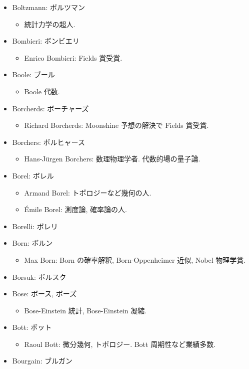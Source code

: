 \documentclass[openany, a4paper, oneside]{jsbook}
\begin{document}
\begin{itemize}
\item Boltzmann: ボルツマン
\begin{itemize}
\item 統計力学の超人.
\end{itemize}
\item Bombieri: ボンビエリ
\begin{itemize}
\item Enrico Bombieri: Fields 賞受賞.
\end{itemize}
\item Boole: ブール
\begin{itemize}
\item Boole 代数.
\end{itemize}
\item Borcherds: ボーチャーズ
\begin{itemize}
\item Richard Borcherds: Moonshine 予想の解決で Fields 賞受賞.
\end{itemize}
\item Borchers: ボルヒャース
\begin{itemize}
\item Hans-J\"urgen Borchers: 数理物理学者. 代数的場の量子論.
\end{itemize}
\item Borel: ボレル
\begin{itemize}
\item Armand Borel: トポロジーなど幾何の人.
\item \'Emile Borel: 測度論, 確率論の人.
\end{itemize}
\item Borelli: ボレリ
\item Born: ボルン
\begin{itemize}
\item Max Born: Born の確率解釈, Born-Oppenheimer 近似, Nobel 物理学賞.
\end{itemize}
\item Borsuk: ボルスク
\item Bose: ボース, ボーズ
\begin{itemize}
\item Bose-Einstein 統計, Bose-Einstein 凝縮.
\end{itemize}
\item Bott: ボット
\begin{itemize}
\item Raoul Bott: 微分幾何, トポロジー. Bott 周期性など業績多数.
\end{itemize}
\item Bourgain: ブルガン

\end{itemize}
\end{document}
